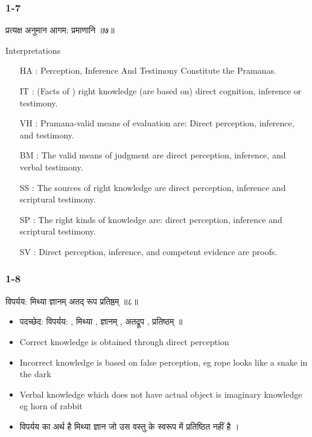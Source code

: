 \begin{frame}[fragile]\frametitle{1-7}

\begin{sanskrit}
प्रत्यक्ष अनुमान आगम: प्रमाणानि ॥७॥
\end{sanskrit}


Interpretations
\begin{itemize}		
\item [HA]: Perception, Inference And Testimony Constitute the Pramanas.
\item [IT]: (Facts of ) right knowledge (are based on) direct cognition, inference or testimony.
\item [VH]: Pramana-valid means of evaluation are: Direct perception, inference, and testimony.
\item [BM]: The valid means of judgment are direct perception, inference, and verbal testimony.
\item [SS]: The sources of right knowledge are direct perception, inference and scriptural testimony.
\item [SP]: The right kinds of knowledge are: direct perception, inference and scriptural testimony.
\item [SV]: Direct perception, inference, and competent evidence are proofs.
\end{itemize}

\end{frame}

\begin{frame}[fragile]\frametitle{1-8}

\begin{sanskrit}
विपर्यय: मिथ्या ज्ञानम् अतद् रूप प्रतिष्ठम् ॥८॥
\end{sanskrit}


\begin{itemize}
\item पदच्छेद: विपर्यय: , मिथ्या , ज्ञानम् , अतद्रूप , प्रतिष्ठम् ॥
\item Correct knowledge is obtained through direct perception
\item Incorrect knowledge is based on false perception, eg rope looks like a snake in the dark
\item Verbal knowledge which does not have actual object is imaginary knowledge eg horn of rabbit
\item विपर्यय का अर्थ है मिथ्या ज्ञान जो उस वस्तु के स्वरूप में प्रतिष्ठित नहीं है ।
\end{itemize}

\end{frame}

